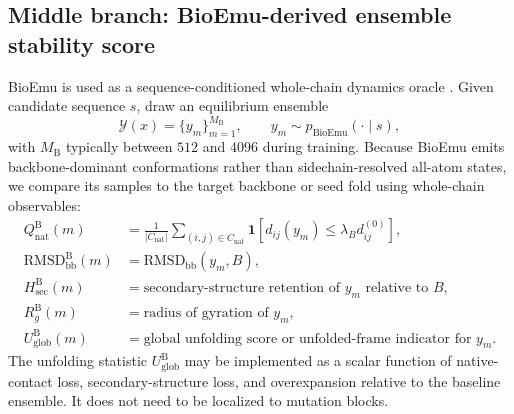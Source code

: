 \documentclass[11pt]{article}
\begin{document}
\subsection{Middle branch: BioEmu-derived ensemble stability score}

BioEmu is used as a sequence-conditioned whole-chain dynamics oracle \citep{lewis2024bioemu}. Given candidate sequence $s$, draw an equilibrium ensemble
\[
\mathcal{Y}(x)=\{y_m\}_{m=1}^{M_{\mathrm B}}, \qquad y_m \sim p_{\mathrm{BioEmu}}(\cdot \mid s),
\]
with $M_{\mathrm B}$ typically between $512$ and $4096$ during training. Because BioEmu emits backbone-dominant conformations rather than sidechain-resolved all-atom states, we compare its samples to the target backbone or seed fold using whole-chain observables:
\begin{align}
    Q_{\mathrm{nat}}^{\mathrm B}(m) &= \frac{1}{|C_{\mathrm{nat}}|}\sum_{(i,j)\in C_{\mathrm{nat}}}\mathbf{1}\!\left[d_{ij}(y_m)\leq \lambda_B d_{ij}^{(0)}\right],\\
    \mathrm{RMSD}_{\mathrm{bb}}^{\mathrm B}(m) &= \mathrm{RMSD}_{\mathrm{bb}}(y_m,B),\\
    H_{\mathrm{sec}}^{\mathrm B}(m) &= \text{secondary-structure retention of }y_m\text{ relative to }B,\\
    R_g^{\mathrm B}(m) &= \text{radius of gyration of }y_m,\\
    U_{\mathrm{glob}}^{\mathrm B}(m) &= \text{global unfolding score or unfolded-frame indicator for }y_m.
\end{align}
The unfolding statistic $U_{\mathrm{glob}}^{\mathrm B}$ may be implemented as a scalar function of native-contact loss, secondary-structure loss, and overexpansion relative to the baseline ensemble. It does not need to be localized to mutation blocks.
\end{document}
